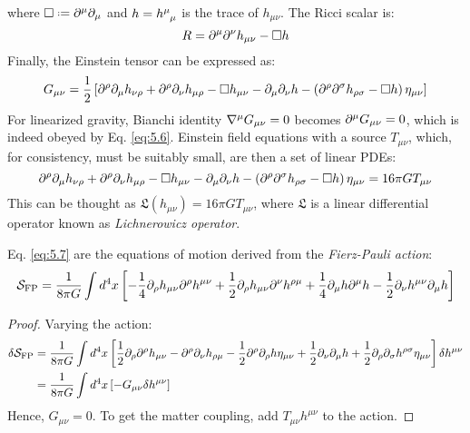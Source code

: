 where $ \Box \defeq \pa^\mu \pa_\mu $ and $ h = \tensor{h}{^\mu_\mu} $ is the trace of $ h_{\mu \nu} $. The Ricci scalar is:
\begin{equation}
  R = \partial^\mu \partial^\nu h_{\mu \nu} - \Box h
  \label{eq:5.5}
\end{equation}
Finally, the Einstein tensor can be expressed as:
\begin{equation}
  G_{\mu \nu} = \frac{1}{2} \left[ \partial^\rho \partial_\mu h_{\nu \rho} + \partial^\rho \partial_\nu h_{\mu \rho} - \Box h_{\mu \nu} - \partial_\mu \partial_\nu h - \left( \partial^\rho \partial^\sigma h_{\rho \sigma} - \Box h \right) \eta_{\mu \nu} \right]
  \label{eq:5.6}
\end{equation}
For linearized gravity, Bianchi identity $ \nabla^\mu G_{\mu \nu} = 0 $ becomes $ \partial^\mu G_{\mu \nu} = 0 $, which is indeed obeyed by Eq. \ref{eq:5.6}. Einstein field equations with a source $ T_{\mu \nu} $, which, for consistency, must be suitably small, are then a set of linear PDEs:
\begin{equation}
  \partial^\rho \partial_\mu h_{\nu \rho} + \partial^\rho \partial_\nu h_{\mu \rho} - \Box h_{\mu \nu} - \partial_\mu \partial_\nu h - \left( \partial^\rho \partial^\sigma h_{\rho \sigma} - \Box h \right) \eta_{\mu \nu} = 16\pi G T_{\mu \nu}
  \label{eq:5.7}
\end{equation}
This can be thought as $ \mathfrak{L}(h_{\mu \nu}) = 16\pi G T_{\mu \nu} $, where $ \mathfrak{L} $ is a linear differential operator known as \textit{Lichnerowicz operator}.

\begin{proposition}
  Eq. \ref{eq:5.7} are the equations of motion derived from the \textit{Fierz-Pauli action}:
  \begin{equation}
    \mathcal{S}_{\text{FP}} = \frac{1}{8\pi G} \int d^4 x \left[ - \frac{1}{4} \partial_\rho h_{\mu \nu} \partial^\rho h^{\mu \nu} + \frac{1}{2} \partial_\rho h_{\mu \nu} \partial^\nu h^{\rho \mu} + \frac{1}{4} \partial_\mu h \partial^\mu h - \frac{1}{2} \partial_\nu h^{\mu \nu} \partial_\mu h \right]
    \label{eq:5.8}
  \end{equation}
\end{proposition}
\begin{proof}
  Varying the action:
  \begin{equation*}
    \begin{split}
      \delta \mathcal{S}_{\text{FP}}
      &= \frac{1}{8\pi G} \int d^4 x \left[ \frac{1}{2} \partial_\rho \partial^\rho h_{\mu \nu} - \partial^\rho \partial_\nu h_{\rho \mu} - \frac{1}{2} \partial^\rho \partial_\rho h \eta_{\mu \nu} + \frac{1}{2} \partial_\nu \partial_\mu h + \frac{1}{2} \partial_\rho \partial_\sigma h^{\rho \sigma} \eta_{\mu \nu} \right] \delta h^{\mu \nu} \\
      &= \frac{1}{8\pi G} \int d^4 x \left[ - G_{\mu \nu} \delta h^{\mu \nu} \right]
    \end{split}
  \end{equation*}
  Hence, $ G_{\mu \nu} = 0 $. To get the matter coupling, add $ T_{\mu \nu} h^{\mu \nu} $ to the action.
\end{proof}

